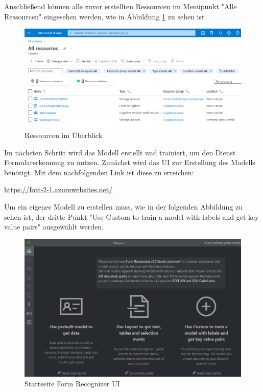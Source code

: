 Anschließend können alle zuvor erstellten Ressourcen im Menüpunkt "Alle Ressourcen" eingesehen werden, wie in Abbildung \ref{fig:ressourcen-überblick} zu sehen ist

\begin{figure}[h]
    \centering
    \includegraphics[scale=0.6]{sections/cloud-computing/images/alle-ressourcen.PNG}
    \caption{Ressourcen im Überblick}
    \label{fig:ressourcen-überblick}
\end{figure}

Im nächsten Schritt wird das Modell erstellt und trainiert, um den Dienst Formularerkennung zu nutzen. Zunächst wird das UI zur Erstellung
des Modells benötigt. Mit dem nachfolgenden Link ist diese zu erreichen:

\begin{center}\url{https://fott-2-1.azurewebsites.net/}\end{center}

Um ein eigenes Modell zu erstellen muss, wie in der folgenden Abbildung zu sehen ist, der dritte Punkt "Use Custom to train a model with labels and get key value pairs" ausgewählt werden.

\begin{figure}[h]
    \centering
    \includegraphics[scale=0.4]{sections/cloud-computing/images/formrecognizer-UI.PNG}
    \caption{Startseite Form Recognizer UI}
    \label{fig:formrecognizer-UI}
\end{figure}

